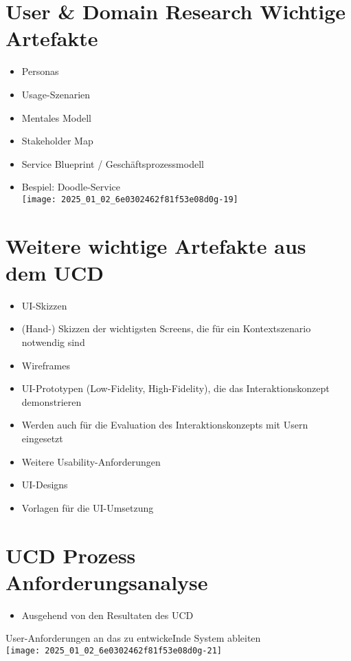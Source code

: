 \documentclass[10pt]{article}
\begin{document}
\section*{User \& Domain Research Wichtige Artefakte}
\begin{itemize}
  \item Personas
  \item Usage-Szenarien
  \item Mentales Modell
  \item Stakeholder Map
  \item Service Blueprint / Geschäftsprozessmodell
  \item Bespiel: Doodle-Service\\
\texttt{[image: 2025\_01\_02\_6e0302462f81f53e08d0g-19]}
\end{itemize}

\section*{Weitere wichtige Artefakte aus dem UCD}
\begin{itemize}
  \item UI-Skizzen
  \item (Hand-) Skizzen der wichtigsten Screens, die für ein Kontextszenario notwendig sind
  \item Wireframes
  \item UI-Prototypen (Low-Fidelity, High-Fidelity), die das Interaktionskonzept demonstrieren
  \item Werden auch für die Evaluation des Interaktionskonzepts mit Usern eingesetzt
  \item Weitere Usability-Anforderungen
  \item UI-Designs
  \item Vorlagen für die UI-Umsetzung
\end{itemize}

\section*{UCD Prozess \\
 Anforderungsanalyse}
\begin{itemize}
  \item Ausgehend von den Resultaten des UCD
\end{itemize}

User-Anforderungen an das zu entwickeInde System ableiten\\
\texttt{[image: 2025\_01\_02\_6e0302462f81f53e08d0g-21]}
\end{document}
